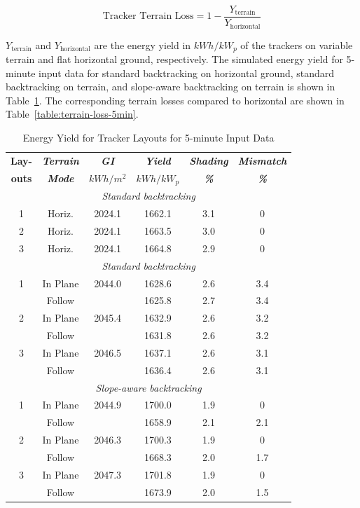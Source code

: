\documentclass[conference]{IEEEtran}
\begin{document}
\begin{equation}
\text{Tracker Terrain Loss} = 1 - \frac{Y_\text{terrain}}{Y_\text{horizontal}}\label{eq:tracker-terrain-loss}
\end{equation}

$Y_\text{terrain}$ and $Y_\text{horizontal}$ are the energy yield in $kWh/kW_p$ of the trackers on variable terrain and flat horizontal ground, respectively. The simulated energy yield for 5-minute input data for standard backtracking on horizontal ground, standard backtracking on terrain, and slope-aware backtracking on terrain is shown in Table~\ref{table:energy-5min}. The corresponding terrain losses compared to horizontal are shown in Table~\ref{table:terrain-loss-5min}. 


\begin{table}[htbp]
\caption{Energy Yield for Tracker Layouts for 5-minute Input Data}
\begin{center}
\begin{tabular}{|c|c|c|c|c|c|}
\hline
\textbf{Lay-}& \textbf{\textit{Terrain}}& \textbf{\textit{GI}}&        \textbf{\textit{Yield}}&        \textbf{\textit{Shading}}& \textbf{\textit{Mismatch}} \\
\textbf{outs}& \textbf{\textit{Mode}}&    \textbf{\textit{$kWh/m^2$}}& \textbf{\textit{$kWh / kW_p$}}& \textbf{\textit{\%}}&      \textbf{\textit{\%}} \\
\hline
\multicolumn{6}{|c|}{\textit{Standard backtracking}} \\
\hline
1& Horiz.& 2024.1&  1662.1& 3.1& 0 \\
\hline
2& Horiz.& 2024.1&  1663.5& 3.0& 0 \\
 \hline
3& Horiz.& 2024.1&  1664.8& 2.9& 0 \\
\hline
\multicolumn{6}{|c|}{\textit{Standard backtracking}} \\
\hline
1& In Plane& 2044.0&  1628.6& 2.6& 3.4 \\
 & Follow&         &  1625.8& 2.7& 3.4 \\
\hline
2& In Plane& 2045.4&  1632.9& 2.6& 3.2 \\
 & Follow&         &  1631.8& 2.6& 3.2 \\
\hline
3& In Plane& 2046.5&  1637.1& 2.6& 3.1 \\
 & Follow&         &  1636.4& 2.6& 3.1 \\
\hline
\multicolumn{6}{|c|}{\textit{Slope-aware backtracking}} \\
\hline
1& In Plane& 2044.9&  1700.0& 1.9& 0 \\
 & Follow&         &  1658.9& 2.1& 2.1 \\
\hline
2& In Plane& 2046.3&  1700.3& 1.9& 0 \\
 & Follow&         &  1668.3& 2.0& 1.7 \\
\hline
3& In Plane& 2047.3&  1701.8& 1.9& 0 \\
 & Follow&         &  1673.9& 2.0& 1.5 \\
\hline
\end{tabular}
\label{table:energy-5min}
\end{center}
\end{table}
\end{document}
